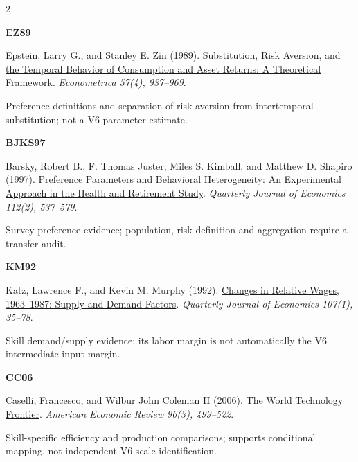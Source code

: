\documentclass[10pt,a4paper,landscape]{article}
\begin{document}
\begin{multicols}{2}\raggedright\fontsize{9}{10.5}\selectfont

\noindent\begin{minipage}{\linewidth}\raggedright\hypertarget{ref:EZ}{\textbf{EZ89}} Epstein, Larry G., and Stanley E. Zin (1989). \href{https://doi.org/10.2307/1913778}{Substitution, Risk Aversion, and the Temporal Behavior of Consumption and Asset Returns: A Theoretical Framework}. \emph{Econometrica 57(4), 937--969}.\par Preference definitions and separation of risk aversion from intertemporal substitution; not a V6 parameter estimate.\end{minipage}\par\vspace{6pt}
\noindent\begin{minipage}{\linewidth}\raggedright\hypertarget{ref:BJKS}{\textbf{BJKS97}} Barsky, Robert B., F. Thomas Juster, Miles S. Kimball, and Matthew D. Shapiro (1997). \href{https://doi.org/10.1162/003355397555280}{Preference Parameters and Behavioral Heterogeneity: An Experimental Approach in the Health and Retirement Study}. \emph{Quarterly Journal of Economics 112(2), 537--579}.\par Survey preference evidence; population, risk definition and aggregation require a transfer audit.\end{minipage}\par\vspace{6pt}
\noindent\begin{minipage}{\linewidth}\raggedright\hypertarget{ref:KM}{\textbf{KM92}} Katz, Lawrence F., and Kevin M. Murphy (1992). \href{https://doi.org/10.2307/2118323}{Changes in Relative Wages, 1963--1987: Supply and Demand Factors}. \emph{Quarterly Journal of Economics 107(1), 35--78}.\par Skill demand/supply evidence; its labor margin is not automatically the V6 intermediate-input margin.\end{minipage}\par\vspace{6pt}
\noindent\begin{minipage}{\linewidth}\raggedright\hypertarget{ref:CC}{\textbf{CC06}} Caselli, Francesco, and Wilbur John Coleman II (2006). \href{https://doi.org/10.1257/aer.96.3.499}{The World Technology Frontier}. \emph{American Economic Review 96(3), 499--522}.\par Skill-specific efficiency and production comparisons; supports conditional mapping, not independent V6 scale identification.\end{minipage}\par\vspace{6pt}

\end{multicols}
\end{document}
